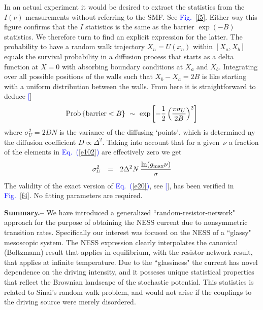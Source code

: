 \documentclass[aps,prl,floats,floatfix,twocolumn]{revtex4}
\newcommand{\mylabel}[1]{\label{#1}}
\newcommand{\eeq}{\end{eqnarray}}
\newcommand{\be}[1]{\begin{eqnarray}\ifthenelse{#1=-1}
{\nonumber}{\ifthenelse{#1=0}{}{\mylabel{e#1}}}}
\newcommand{\sect}[1]{{\bf #1.-- }}
\newcommand{\Eq}[1]{\textcolor{blue}{Eq.\!\!~(\ref{#1})}}
\newcommand{\Fig}[1]{\textcolor{blue}{Fig.}\!\!~\ref{#1}}
\renewcommand{\cite}[1]{\textcolor{blue}{[\onlinecite{#1}}]} %
\begin{document}
In an actual experiment it would be desired to 
extract the statistics from the $I(\nu)$ measurements 
without referring to the SMF. See \Fig{f5}.
Either way this figure confirms that the $I$ statistics
is the same as the barrier ${\exp(-B)}$ statistics. 
We therefore turn to find an explicit expression for the latter. 
%
%
The probability to have a random walk trajectory $X_n=U(x_n)$ within $[X_a,X_b]$ 
equals the survival probability in a diffusion process  
that starts as a delta function at ${X=0}$ 
with absorbing boundary conditions at $X_a$ and $X_b$.   
Integrating over all possible positions of the walls 
such that ${X_b-X_a=2B}$ is like starting with a 
uniform distribution between the walls. From here 
it is straightforward to deduce \cite{SM}
%
\be{20}
\text{Prob}\left\{\text{barrier}<B\right\} \ \sim \ \exp\left[-\frac{1}{2} \left(\frac{\pi \sigma_U}{2B}\right)^2\right] 
\eeq
%
where $\sigma_U^2 = 2D N$ is the variance of the diffusing `points', 
which is determined ny the diffusion coefficient $D\propto \Delta^2$.
Taking into account that for a given~$\nu$ a fraction of the elements
in \Eq{e102} are effectively zero we get 
%
\be{211}
\sigma_U^2 \ \ = \ \ 2 \Delta^2 N  \, \frac{\ln(g_{\text{max}}\nu)}{\sigma}
\eeq  
%  
The validity of the exact version of \Eq{e20}, see \cite{SM}, 
has been verified in \Fig{f4}. No fitting parameters are required. 


\sect{Summary}
%
%
We have introduced a generalized ``random-resistor-network"
approach for the purpose of obtaining the NESS current
due to nonsymmetric transition rates. Specifically our 
interest was focused on the NESS of a ``glassy" mesoscopic system. 
The NESS expression clearly interpolates the canonical (Boltzmann) result 
that applies in equilibrium, with the resistor-network result, 
that applies at infinite temperature. 
Due to the ``glassiness" the current has novel dependence 
on the driving intensity, and it posseses unique statistical properties 
that reflect the Brownian landscape of the stochastic potential.
This statistics is related to Sinai's random walk problem, 
and would not arise if the couplings to the driving source 
were merely disordered.


\clearpage
\end{document}
